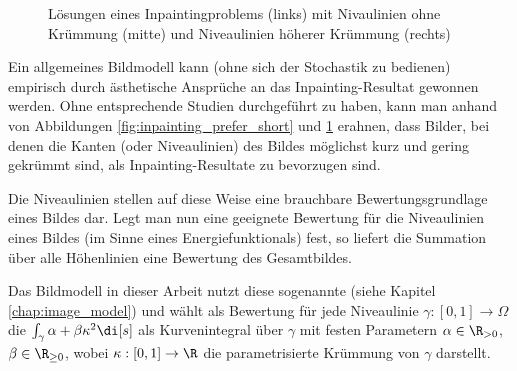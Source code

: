 \documentclass{mythesis}
\begin{document}
\begin{figure}[ht]
    \begin{subfigure}[b]{0.33\textwidth}
	\centering
    \end{subfigure}%
    \begin{subfigure}[b]{0.33\textwidth}
	\centering
    \end{subfigure}%
    \begin{subfigure}[b]{0.33\textwidth}
	\centering
    \end{subfigure}
    \caption{Lösungen eines Inpaintingproblems (links) mit Nivaulinien ohne Krümmung (mitte) und Niveaulinien höherer Krümmung (rechts)}
    \label{fig:inpainting_prefer_non_curved}
\end{figure}

Ein allgemeines Bildmodell kann (ohne sich der Stochastik zu bedienen) empirisch durch ästhetische Ansprüche an das Inpainting-Resultat gewonnen werden.
Ohne entsprechende Studien durchgeführt zu haben, kann man anhand von Abbildungen \ref{fig:inpainting_prefer_short} und \ref{fig:inpainting_prefer_non_curved} erahnen, dass Bilder, bei denen die Kanten (oder Niveaulinien) des Bildes möglichst kurz und gering gekrümmt sind, als Inpainting-Resultate zu bevorzugen sind.

Die Niveaulinien stellen auf diese Weise eine brauchbare Bewertungsgrundlage eines Bildes dar.
Legt man nun eine geeignete Bewertung für die Niveaulinien eines Bildes (im Sinne eines Energiefunktionals) fest, so liefert die Summation über alle Höhenlinien eine Bewertung des Gesamtbildes.

Das Bildmodell in dieser Arbeit nutzt diese sogenannte  (siehe Kapitel \ref{chap:image_model}) und wählt als Bewertung für jede Niveaulinie $\gamma:[0,1] \to \Omega$ die 
\begin{math}
    \int_{\gamma} \alpha + \beta \kappa^2 \di[s]
\end{math}
als Kurvenintegral über $\gamma$ mit festen Parametern $\alpha \in \R_{>0}$, $\beta \in \R_{\ge 0}$, wobei $\kappa: [0,1] \to \R$ die parametrisierte Krümmung von $\gamma$ darstellt.
\end{document}
